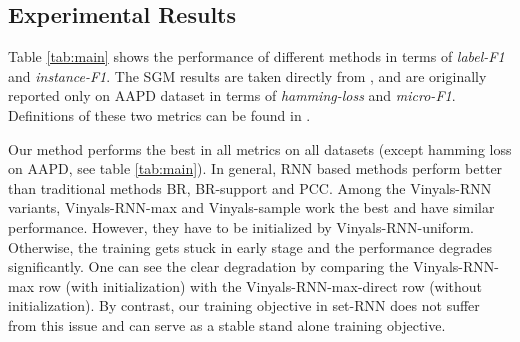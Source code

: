 

\subsection{Experimental Results}


Table \ref{tab:main} shows the performance of different methods in terms of \emph{label-F1} and \emph{instance-F1}. The SGM results are taken directly from \cite{DBLP:journals/corr/abs-1806-04822}, and are originally reported only on AAPD dataset in terms of \emph{hamming-loss} and \emph{micro-F1}. Definitions of these two metrics can be found in \cite{koyejo2015consistent}. 

 
Our method performs the best in all metrics on all datasets (except hamming loss on AAPD, see table \ref{tab:main}). In general, RNN based methods perform better than traditional methods BR, BR-support and PCC. Among the Vinyals-RNN variants, Vinyals-RNN-max and Vinyals-sample work the best and have similar performance. However, they have to be initialized by Vinyals-RNN-uniform. Otherwise, the training gets stuck in early stage and the performance degrades significantly. One can see the clear degradation by comparing the Vinyals-RNN-max row (with initialization) with the Vinyals-RNN-max-direct row (without initialization). By contrast, our training objective in set-RNN does not suffer from this issue and can serve as a stable stand alone training objective.

